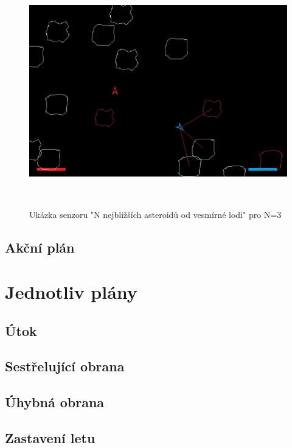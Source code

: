 \begin{figure}[p]

    \includegraphics[width=150mm, height=100mm]{./Obrazky/N_nearest_asteroids.png}
    \caption{Ukázka senzoru "N nejbližších asteroidů od vesmírné lodi" pro N=3}
    \label{obr02:}
    \end{figure}


\subsection{Akční plán}


\section{Jednotliv plány}
\subsection{Útok}
\subsection{Sestřelující obrana}
\subsection{Úhybná obrana}
\subsection{Zastavení letu}




